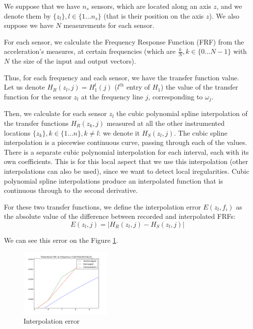 \documentclass[journal]{IEEEtran}
\begin{document}
We suppose that we have $n_s$ sensors, which are located along an axis $z$, and we denote them by
$\{z_l\}, l\in \{1 ... n_s\}$ (that is their position on the axis $z$). We also suppose we have $N$ measurements for each sensor.

For each sensor, we calculate the Frequency Response Function (FRF) from the acceleration's measures, at certain frequencies
(which are $\frac{k}{N}, k \in \{0 ... N-1\}$ with $N$ the size of the input and output vectors).

Thus, for each frequency and each sensor, we have the transfer function value. Let us denote $H_R(z_l,j) = H_1^l(j)$ ($l^{th}$ entry of $H_1$) the value of the transfer function for the sensor $z_l$ at the frequency line $j$, corresponding to $\omega_j$.

Then, we calculate for each sensor $z_l$ the cubic polynomial spline interpolation of the transfer functions $H_R(z_k,j)$ measured at all
the other instrumented locations $\{z_k\}, k\in \{1 ... n\}, k \neq l$: we denote it $H_S(z_l,j)$.
The cubic spline interpolation is a piecewise continuous curve, passing through each of the values.
There is a separate cubic polynomial interpolation for each interval, each with its own coefficients.
This is for this local aspect that we use this interpolation (other interpolations can also be used), since we want to detect local iregularities.
Cubic polynomial spline interpolations produce an interpolated function that is continuous through to the second derivative.

For these two transfer functions, we define the interpolation error $E(z_l,f_i)$ as the absolute value of the difference between recorded and interpolated FRFs:
\begin{equation}
E(z_l,j) = | H_R(z_l,j) - H_S(z_l,j) |
\end{equation}

We can see this error on the Figure \ref{interpolation_error}.


\begin{figure}[h!]
  \centering
  \includegraphics[width=0.4\textwidth]{images/interpolation.png}
  \caption{Interpolation error}
  \label{interpolation_error}
\end{figure}
\end{document}
